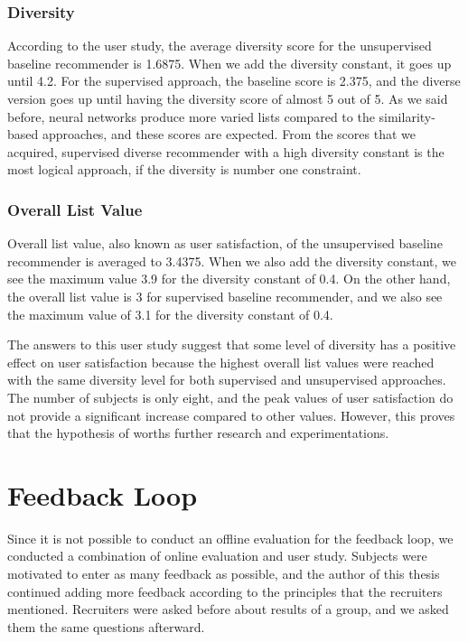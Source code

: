 \subsubsection{Diversity}

According to the user study, the average diversity score for the unsupervised baseline recommender is 1.6875. When we add the diversity constant, it goes up until 4.2. For the supervised approach, the baseline score is 2.375, and the diverse version goes up until having the diversity score of almost 5 out of 5. As we said before, neural networks produce more varied lists compared to the similarity-based approaches, and these scores are expected. From the scores that we acquired, supervised diverse recommender with a high diversity constant is the most logical approach, if the diversity is number one constraint. 

\subsubsection{Overall List Value}

Overall list value, also known as user satisfaction, of the unsupervised baseline recommender is averaged to 3.4375. When we also add the diversity constant, we see the maximum value 3.9 for the diversity constant of 0.4. On the other hand, the overall list value is 3 for supervised baseline recommender, and we also see the maximum value of 3.1 for the diversity constant of 0.4.

The answers to this user study suggest that some level of diversity has a positive effect on user satisfaction because the highest overall list values were reached with the same diversity level for both supervised and unsupervised approaches. The number of subjects is only eight, and the peak values of user satisfaction do not provide a significant increase compared to other values. However, this proves that the hypothesis of worths further research and experimentations.

\section{Feedback Loop}

Since it is not possible to conduct an offline evaluation for the feedback loop, we conducted a combination of online evaluation and user study. Subjects were motivated to enter as many feedback as possible, and the author of this thesis continued adding more feedback according to the principles that the recruiters mentioned. Recruiters were asked before about results of a group, and we asked them the same questions afterward. 

